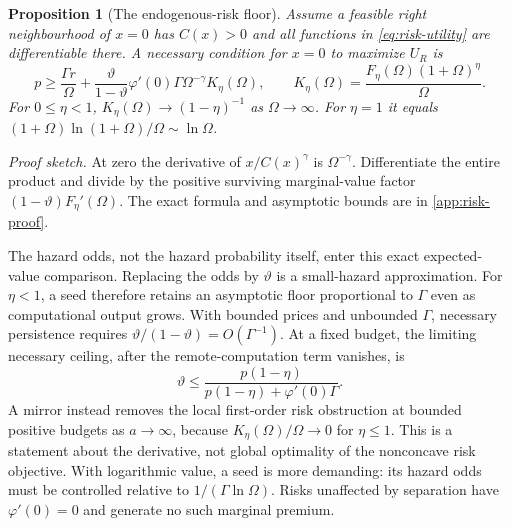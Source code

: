 \documentclass[11pt,a4paper]{article}
\newtheorem{proposition}{Proposition}
\theoremstyle{definition}\newtheorem{definition}{Definition}
\begin{document}
\begin{proposition}[The endogenous-risk floor]
\label{prop:endogenous-risk}
Assume a feasible right neighbourhood of $x=0$ has $C(x)>0$ and all
functions in \cref{eq:risk-utility} are differentiable there. A necessary
condition for $x=0$ to maximize $U_R$ is
\begin{equation}
 p\geq\frac{\Gamma r}{\Omega}
 +\frac{\vartheta}{1-\vartheta}\varphi'(0)
       \Gamma\Omega^{-\gamma}K_\eta(\Omega),\qquad
 K_\eta(\Omega)=\frac{F_\eta(\Omega)(1+\Omega)^\eta}{\Omega}.
 \label{eq:risk-floor}
\end{equation}
For $0\leq\eta<1$, $K_\eta(\Omega)\to(1-\eta)^{-1}$ as
$\Omega\to\infty$. For $\eta=1$ it equals
$(1+\Omega)\ln(1+\Omega)/\Omega\sim\ln\Omega$.
\end{proposition}
\noindent\emph{Proof sketch.}
At zero the derivative of $x/C(x)^\gamma$ is $\Omega^{-\gamma}$.
Differentiate the entire product and divide by the positive surviving
marginal-value factor $(1-\vartheta)F_\eta'(\Omega)$.
The exact formula and asymptotic bounds are in \cref{app:risk-proof}.

The hazard odds, not the hazard probability itself, enter this exact
expected-value comparison. Replacing the odds by $\vartheta$ is a
small-hazard approximation. For $\eta<1$, a seed therefore retains an
asymptotic floor proportional to $\Gamma$ even as computational output
grows. With bounded prices and unbounded $\Gamma$, necessary persistence
requires $\vartheta/(1-\vartheta)=O(\Gamma^{-1})$. At a fixed budget,
the limiting necessary ceiling, after the remote-computation term vanishes,
is
\begin{equation}
 \vartheta\leq
 \frac{p(1-\eta)}{p(1-\eta)+\varphi'(0)\Gamma}.
 \label{eq:hazard-ceiling}
\end{equation}
A mirror instead removes the local first-order risk obstruction at bounded
positive budgets as $a\to\infty$, because
$K_\eta(\Omega)/\Omega\to0$ for $\eta\leq1$. This is a statement about
the derivative, not global optimality of the nonconcave risk objective.
With logarithmic value, a seed is more demanding: its hazard odds must
be controlled relative to $1/(\Gamma\ln\Omega)$. Risks unaffected by
separation have $\varphi'(0)=0$ and generate no such marginal premium.
\end{document}
